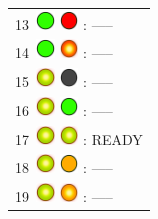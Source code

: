 \documentclass[12pt, a4paper]{report}
\begin{document}
\begin{minipage}{0.6\textwidth}
\begin{Large}
\begin{tabular}{l}
		13\  \includegraphics*[width=5mm]{green_led} \includegraphics*[width=5mm]{red_led} : -----\\
		
		14\  \includegraphics*[width=5mm]{green_led} \includegraphics*[width=5mm]{red_led_flashing} : -----\\
		
		15\  \includegraphics*[width=5mm]{green_led_flashing} \includegraphics*[width=5mm]{off_led} : -----\\
		
		16\  \includegraphics*[width=5mm]{green_led_flashing} \includegraphics*[width=5mm]{green_led} : -----\\
		
		17\  \includegraphics*[width=5mm]{green_led_flashing} \includegraphics*[width=5mm]{green_led_flashing} : READY\\
		
		18\  \includegraphics*[width=5mm]{green_led_flashing} \includegraphics*[width=5mm]{orange_led} : -----\\
		
		19\  \includegraphics*[width=5mm]{green_led_flashing} \includegraphics*[width=5mm]{orange_led_flashing} : -----\\
		

\end{tabular}
\end{Large}
\end{minipage}
\end{document}
